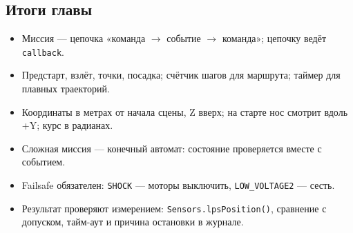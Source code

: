 \subsection*{Итоги главы}
\begin{itemize}
    \item Миссия --- цепочка «команда $\to$ событие $\to$ команда»; цепочку ведёт \verb|callback|.
    \item Предстарт, взлёт, точки, посадка; счётчик шагов для маршрута; таймер для плавных траекторий.
    \item Координаты в метрах от начала сцены, Z вверх; на старте нос смотрит вдоль +Y; курс в радианах.
    \item Сложная миссия --- конечный автомат: состояние проверяется вместе с событием.
    \item Failsafe обязателен: \verb|SHOCK| --- моторы выключить, \verb|LOW_VOLTAGE2| --- сесть.
    \item Результат проверяют измерением: \verb|Sensors.lpsPosition()|, сравнение с допуском, тайм-аут и причина остановки в журнале.
\end{itemize}
